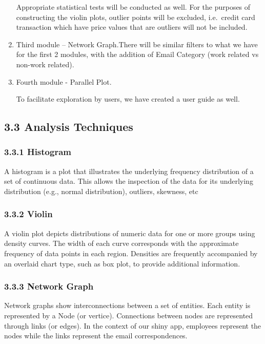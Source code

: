 \documentclass{acm_proc_article-sp}
\begin{document}
\begin{enumerate}
  Appropriate statistical tests will be conducted as well. For the purposes of constructing the violin plots, outlier points will be excluded, i.e.~credit card transaction which have price values that are outliers will not be included.
\item
  Third module -- Network Graph.There will be similar filters to what we have for the first 2 modules, with the addition of Email Category (work related vs non-work related).
\item
  Fourth module - Parallel Plot.

  To facilitate exploration by users, we have created a user guide as well.
\end{enumerate}

\hypertarget{analysis-techniques}{%
\subsection{3.3 Analysis Techniques}\label{analysis-techniques}}

\hypertarget{histogram}{%
\subsubsection{3.3.1 Histogram}\label{histogram}}

A histogram is a plot that illustrates the underlying frequency distribution of a set of continuous data. This allows the inspection of the data for its underlying distribution (e.g., normal distribution), outliers, skewness, etc

\hypertarget{violin}{%
\subsubsection{3.3.2 Violin}\label{violin}}

A violin plot depicts distributions of numeric data for one or more groups using density curves. The width of each curve corresponds with the approximate frequency of data points in each region. Densities are frequently accompanied by an overlaid chart type, such as box plot, to provide additional information.

\hypertarget{network-graph}{%
\subsubsection{3.3.3 Network Graph}\label{network-graph}}

Network graphs show interconnections between a set of entities. Each entity is represented by a Node (or vertice). Connections between nodes are represented through links (or edges). In the context of our shiny app, employees represent the nodes while the links represent the email correspondences.
\end{document}
